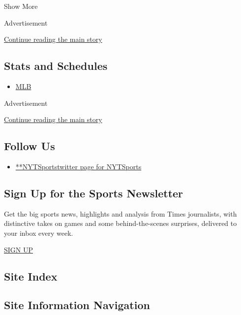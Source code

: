 Show More

Advertisement

\protect\hyperlink{after-mid1}{Continue reading the main story}

\hypertarget{stats-and-schedules}{%
\subsection{Stats and Schedules}\label{stats-and-schedules}}

\begin{itemize}
\tightlist
\item
  \protect\hyperlink{}{MLB}
\end{itemize}

Advertisement

\protect\hyperlink{after-mktg}{Continue reading the main story}

\hypertarget{follow-us}{%
\subsection{Follow Us}\label{follow-us}}

\begin{itemize}
\tightlist
\item
  \href{https://twitter.com/NYTSports}{**NYTSportstwitter page for
  NYTSports}
\end{itemize}

\hypertarget{sign-up-for-the-sports-newsletter}{%
\subsection{Sign Up for the Sports
Newsletter}\label{sign-up-for-the-sports-newsletter}}

Get the big sports news, highlights and analysis from Times journalists,
with distinctive takes on games and some behind-the-scenes surprises,
delivered to your inbox every week.

\href{/newsletters/signup/SP}{SIGN UP}

\hypertarget{site-index}{%
\subsection{Site Index}\label{site-index}}

\hypertarget{site-information-navigation}{%
\subsection{Site Information
Navigation}\label{site-information-navigation}}

